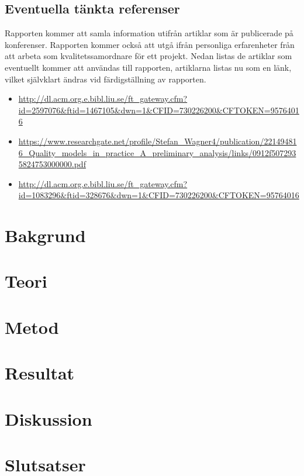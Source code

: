 \newpage
\subsection{Eventuella tänkta referenser}

Rapporten kommer att samla information utifrån artiklar som är publicerade på konferenser. Rapporten kommer också att utgå ifrån personliga erfarenheter från att arbeta som kvalitetssamordnare för ett projekt. Nedan listas de artiklar som eventuellt kommer att användas till rapporten, artiklarna listas nu som en länk, vilket självklart ändras vid färdigställning av rapporten.

\begin{itemize}
	\item \url{http://dl.acm.org.e.bibl.liu.se/ft_gateway.cfm?id=2597076&ftid=1467105&dwn=1&CFID=730226200&CFTOKEN=95764016}
	\item \url{https://www.researchgate.net/profile/Stefan_Wagner4/publication/221494816_Quality_models_in_practice_A_preliminary_analysis/links/0912f5072935824753000000.pdf}
	\item \url{http://dl.acm.org.e.bibl.liu.se/ft_gateway.cfm?id=1083296&ftid=328676&dwn=1&CFID=730226200&CFTOKEN=95764016}
	
\end{itemize}

\section{Bakgrund}
\label{sec:background-person}


\section{Teori}
\label{sec:theory-person}


\section{Metod}
\label{sec:method-person}


\section{Resultat}
\label{sec:results-person}


\section{Diskussion}
\label{sec:discussion-person}


\section{Slutsatser}
\label{sec:conclusions-person}


